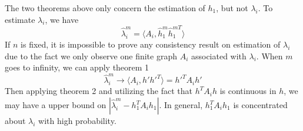 \documentclass[a4paper]{article}
\newenvironment{remark}[1][Remark]{\begin{trivlist}
\item[\hskip \labelsep {\bfseries #1}]}{\end{trivlist}}
\begin{document}
\begin{remark}
The two theorems above only concern the estimation of $h_1$, but not $\lambda_i$. To estimate $\lambda_i$, we have
\[\hat{\lambda}_i^m= \langle A_i,\hat{h}_1^m \hat{h}_1^{m T} \rangle \]If $n$ is fixed, it is impossible to prove any consistency result on estimation of $\lambda_i$ due to the fact we only observe one finite graph $A_i$ associated with $\lambda_i$. When $m$ goes to infinity, we can apply theorem 1
\[\hat{\lambda}_i^m \rightarrow \langle A_i,h' h'^T \rangle = h'^T A_i h'\]
Then applying theorem 2 and utilizing the fact that $h^T A_i h$ is continuous in $h$, we may have a upper bound on $|\hat{\lambda}_i^m - h_1^T A_i h_1|$. In general, $h_1^T A_i h_1$ is concentrated about $\lambda_i$ with high probability.
\end{remark}
\end{document}
